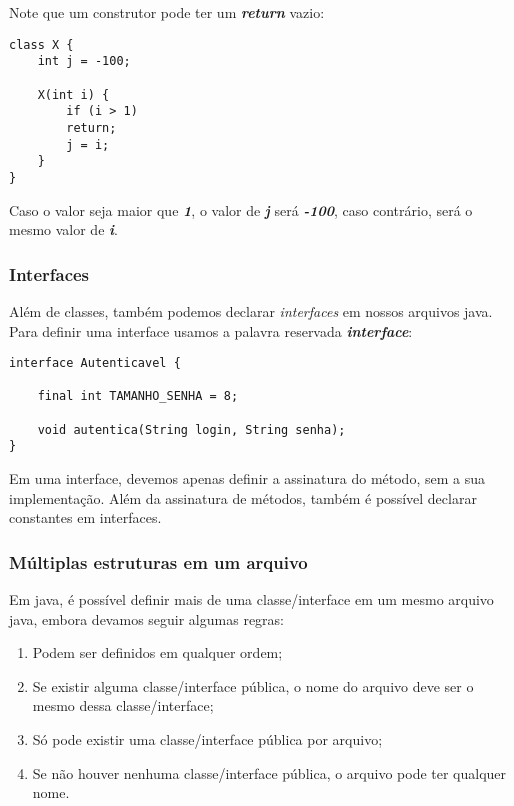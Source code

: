 \documentclass[12pt]{article}
\begin{document}
Note que um construtor pode ter um \textbf{\textit{return}} vazio:

\begin{lstlisting}
class X {
	int j = -100;
	
	X(int i) {
		if (i > 1)
		return;
		j = i;
	}
}
\end{lstlisting}

Caso o valor seja maior que \textbf{\textit{1}}, o valor de \textbf{\textit{j}} será \textbf{\textit{-100}}, caso contrário, será o mesmo valor de \textbf{\textit{i}}.

\subsubsection{Interfaces}

Além de classes, também podemos declarar \textit{interfaces} em nossos arquivos java. Para definir uma interface usamos a palavra reservada \textbf{\textit{interface}}:

\begin{lstlisting}
interface Autenticavel {
	
	final int TAMANHO_SENHA = 8;
	
	void autentica(String login, String senha);
}
\end{lstlisting}

Em uma interface, devemos apenas definir a assinatura do método, sem a sua implementação. Além da assinatura de métodos, também é possível declarar constantes em interfaces.

\subsubsection{Múltiplas estruturas em um arquivo}

Em java, é possível definir mais de uma classe/interface em um mesmo arquivo java, embora devamos seguir algumas regras:

\begin{enumerate}
	\item Podem ser definidos em qualquer ordem;
	\item Se existir alguma classe/interface pública, o nome do arquivo deve ser o mesmo dessa classe/interface;
	\item Só pode existir uma classe/interface pública por arquivo;
	\item Se não houver nenhuma classe/interface pública, o arquivo pode ter qualquer nome.
\end{enumerate}
\end{document}

